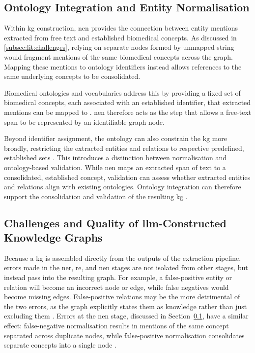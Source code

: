 \subsection{Ontology Integration and Entity Normalisation}
\label{subsec:lit:ontology_integration_and_en}
Within \gls{kg} construction, \gls{nen} provides the connection between entity mentions extracted from free text and established biomedical concepts. As discussed in \ref{subsec:lit:challenges}, relying on separate nodes formed by unmapped string would fragment mentions of the same biomedical concepts across the graph. Mapping these mentions to ontology identifiers instead allows references to the same underlying concepts to be consolidated.

Biomedical ontologies and vocabularies address this by providing a fixed set of biomedical concepts, each associated with an established identifier, that extracted mentions can be mapped to \pref. \gls{nen} therefore acts as the step that allows a free-text span to be represented by an identifiable graph node.

Beyond identifier assignment, the ontology can also constrain the \gls{kg} more broadly, restricting the extracted entities and relations to respective predefined, established sets \pref. This introduces a distinction between normalisation and ontology-based validation. While \gls{nen} maps an extracted span of text to a consolidated, established concept, validation can assess whether extracted entities and relations align with existing ontologies. Ontology integration can therefore support the consolidation and validation of the resulting \gls{kg} \pref.

\subsection{Challenges and Quality of \gls{llm}-Constructed Knowledge Graphs}
\label{subsec:lit:challenges_and_quality_of_llm_kgs}
Because a \gls{kg} is assembled directly from the outputs of the extraction pipeline, errors made in the \gls{ner}, \gls{re}, and \gls{nen} stages are not isolated from other stages, but instead pass into the resulting graph. For example, a false-positive entity or relation will become an incorrect node or edge, while false negatives would become missing edges. False-positive relations may be the more detrimental of the two errors, as the graph explicitly states them as knowledge rather than just excluding them \pref. Errors at the \gls{nen} stage, discussed in Section~\ref{subsec:lit:ontology_integration_and_en}, have a similar effect: false-negative normalisation results in mentions of the same concept separated across duplicate nodes, while false-positive normalisation consolidates separate concepts into a single node \pref.

